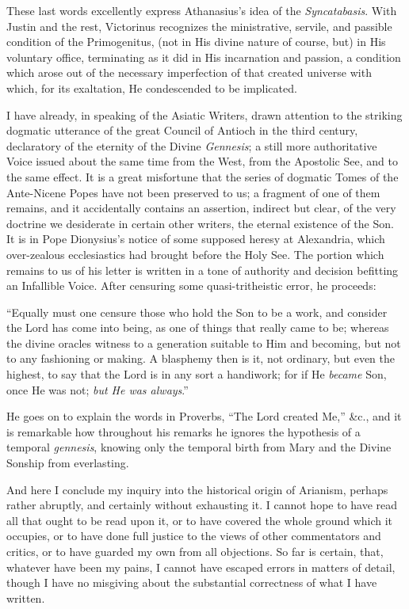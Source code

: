 These last words excellently express Athanasius's idea of the \emph{Syncatabasis}.
With Justin and the rest, Victorinus recognizes the ministrative,
servile, and passible condition of the Primogenitus, (not in His
divine nature of course, but) in His voluntary office, terminating as
it did in His incarnation and passion, a condition which arose out of
the necessary imperfection of that created universe with which, for
its exaltation, He condescended to be implicated.

I have already, in speaking of the Asiatic Writers, drawn attention
to the striking dogmatic utterance of the great Council of Antioch in
the third century, declaratory of the eternity of the Divine \emph{Gennesis};
a still more authoritative Voice issued about the same time from the
West, from the Apostolic See, and to the same effect. It is a great
misfortune that the series of dogmatic Tomes of the Ante-Nicene Popes
have not been preserved to us; a fragment of one of them remains, and
it accidentally contains an assertion, indirect but clear, of the very
doctrine we desiderate in certain other writers, the eternal existence
of the Son. It is in Pope Dionysius's notice of some supposed heresy
at Alexandria, which over-zealous ecclesiastics had brought before the
Holy See. The portion which remains to us of his letter is written in
a tone of authority and decision befitting an Infallible Voice. After
censuring some quasi-tritheistic error, he proceeds:

``Equally must one censure those who hold the Son to be a work,
and consider the Lord has come into being, as one of things that
really came to be; whereas the divine oracles witness to a generation
suitable to Him and becoming, but not to any fashioning or making. A
blasphemy then is it, not ordinary, but even the highest, to say
that the Lord is in any sort a handiwork; for if He \emph{became} Son,
once He was not; \emph{but He was always}.''

He goes on to explain the words in Proverbs, ``The Lord created
Me,'' \&c., and it is remarkable how throughout his remarks he
ignores the hypothesis of a temporal \emph{gennesis}, knowing only the
temporal birth from Mary and the Divine Sonship from everlasting.


And here I conclude my inquiry into the historical origin of
Arianism, perhaps rather abruptly, and certainly without exhausting
it. I cannot hope to have read all that ought to be read upon it, or
to have covered the whole ground which it occupies, or to have done
full justice to the views of other commentators and critics, or to
have guarded my own from all objections. So far is certain, that,
whatever have been my pains, I cannot have escaped errors in matters
of detail, though I have no misgiving about the substantial
correctness of what I have written.

